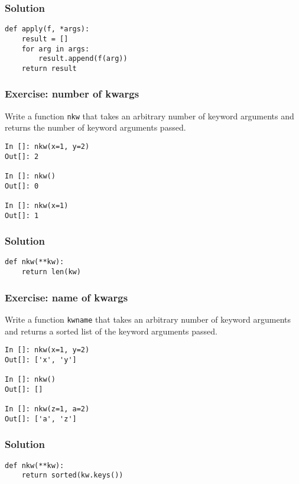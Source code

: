 \documentclass[14pt,compress]{beamer}
\begin{document}
\begin{frame}
  \frametitle{Solution}
\begin{lstlisting}
def apply(f, *args):
    result = []
    for arg in args:
        result.append(f(arg))
    return result
\end{lstlisting}
\end{frame}

\begin{frame}
  \frametitle{Exercise: number of kwargs}
  \begin{block}{}
    Write a function \lstinline{nkw} that takes an arbitrary number of
    keyword arguments and returns the number of keyword arguments passed.
  \end{block}

\begin{lstlisting}
In []: nkw(x=1, y=2)
Out[]: 2

In []: nkw()
Out[]: 0

In []: nkw(x=1)
Out[]: 1
\end{lstlisting}
\end{frame}


\begin{frame}
  \frametitle{Solution}
\begin{lstlisting}
def nkw(**kw):
    return len(kw)
\end{lstlisting}
\end{frame}

\begin{frame}
  \frametitle{Exercise: name of kwargs}
  \begin{block}{}
    Write a function \lstinline{kwname} that takes an arbitrary number of
    keyword arguments and returns a sorted list of the keyword arguments
    passed.
  \end{block}

\begin{lstlisting}
In []: nkw(x=1, y=2)
Out[]: ['x', 'y']

In []: nkw()
Out[]: []

In []: nkw(z=1, a=2)
Out[]: ['a', 'z']
\end{lstlisting}
\end{frame}


\begin{frame}
  \frametitle{Solution}
\begin{lstlisting}
def nkw(**kw):
    return sorted(kw.keys())
\end{lstlisting}
\end{frame}
\end{document}
